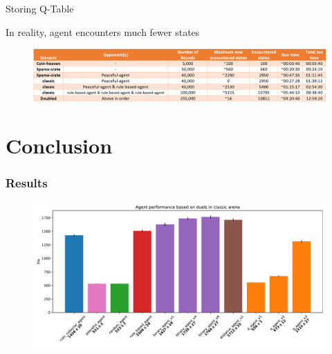 \documentclass{beamer}
\begin{document}
\begin{frame}{Storing Q-Table}
	\begin{center}
	In reality, agent encounters much fewer states
	\end{center}

	\begin{figure}[t]
			\centering
			\includegraphics[width=1\linewidth]{table.png}
	\end{figure}
\end{frame}

\section{Conclusion}

\begin{frame}[fragile]
	\frametitle{Results}
	\pause

	\begin{figure}[t]
			\centering
			\includegraphics[width=1\linewidth]{elo.pdf}
	\end{figure}
\end{frame}
\end{document}
